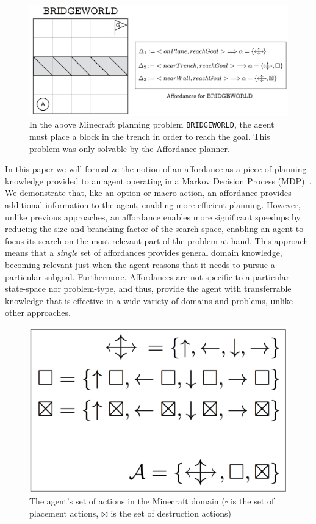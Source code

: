 \documentclass[]{article}
\begin{document}
\begin{figure}
\centering
\includegraphics[scale = 0.18]{figures/bridgeworld.png}
\caption{In the above Minecraft planning problem \texttt{BRIDGEWORLD}, the agent must place a block in the trench in order to reach the goal. This problem was only solvable by the Affordance planner.\label{fig:example}}
\end{figure}

In this paper we will formalize
the notion of an affordance as a piece of planning knowledge provided
to an agent operating in a Markov Decision Process
(MDP)~\citep{kaelbling99}.  We demonstrate that, like an option or
macro-action, an affordance provides additional information to the
agent, enabling more efficient planning.  However, unlike previous
approaches, an affordance enables more significant speedups by
reducing the size and branching-factor of the search space, enabling
an agent to focus its search on the most relevant part of the problem
at hand.  This approach means that a {\em single} set of affordances
provides general domain knowledge, becoming relevant just when the
agent reasons that it needs to pursue a particular subgoal.  Furthermore,
Affordances are not specific to a particular state-space nor problem-type, and thus, provide
the agent with transferrable knowledge that is effective in a wide variety of
domains and problems, unlike other approaches.


\begin{figure}
\centering
\includegraphics[scale = 0.12]{figures/mc_action_set.png}
\caption{The agent's set of actions in the Minecraft domain ($\square$ is the set of placement actions, $\boxtimes$ is the set of destruction actions)\label{fig:example}}
\end{figure}
\end{document}
